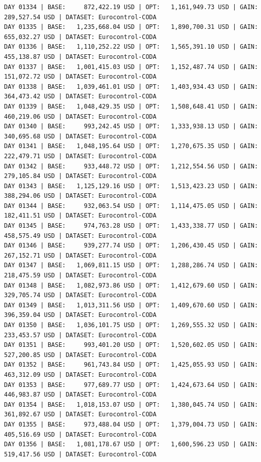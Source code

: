 \documentclass[11pt,a4paper]{article}
\begin{document}
\begin{verbatim}
DAY 01334 | BASE:     872,422.19 USD | OPT:   1,161,949.73 USD | GAIN: 289,527.54 USD | DATASET: Eurocontrol-CODA
DAY 01335 | BASE:   1,235,668.04 USD | OPT:   1,890,700.31 USD | GAIN: 655,032.27 USD | DATASET: Eurocontrol-CODA
DAY 01336 | BASE:   1,110,252.22 USD | OPT:   1,565,391.10 USD | GAIN: 455,138.87 USD | DATASET: Eurocontrol-CODA
DAY 01337 | BASE:   1,001,415.03 USD | OPT:   1,152,487.74 USD | GAIN: 151,072.72 USD | DATASET: Eurocontrol-CODA
DAY 01338 | BASE:   1,039,461.01 USD | OPT:   1,403,934.43 USD | GAIN: 364,473.42 USD | DATASET: Eurocontrol-CODA
DAY 01339 | BASE:   1,048,429.35 USD | OPT:   1,508,648.41 USD | GAIN: 460,219.06 USD | DATASET: Eurocontrol-CODA
DAY 01340 | BASE:     993,242.45 USD | OPT:   1,333,938.13 USD | GAIN: 340,695.68 USD | DATASET: Eurocontrol-CODA
DAY 01341 | BASE:   1,048,195.64 USD | OPT:   1,270,675.35 USD | GAIN: 222,479.71 USD | DATASET: Eurocontrol-CODA
DAY 01342 | BASE:     933,448.72 USD | OPT:   1,212,554.56 USD | GAIN: 279,105.84 USD | DATASET: Eurocontrol-CODA
DAY 01343 | BASE:   1,125,129.16 USD | OPT:   1,513,423.23 USD | GAIN: 388,294.06 USD | DATASET: Eurocontrol-CODA
DAY 01344 | BASE:     932,063.54 USD | OPT:   1,114,475.05 USD | GAIN: 182,411.51 USD | DATASET: Eurocontrol-CODA
DAY 01345 | BASE:     974,763.28 USD | OPT:   1,433,338.77 USD | GAIN: 458,575.49 USD | DATASET: Eurocontrol-CODA
DAY 01346 | BASE:     939,277.74 USD | OPT:   1,206,430.45 USD | GAIN: 267,152.71 USD | DATASET: Eurocontrol-CODA
DAY 01347 | BASE:   1,069,811.15 USD | OPT:   1,288,286.74 USD | GAIN: 218,475.59 USD | DATASET: Eurocontrol-CODA
DAY 01348 | BASE:   1,082,973.86 USD | OPT:   1,412,679.60 USD | GAIN: 329,705.74 USD | DATASET: Eurocontrol-CODA
DAY 01349 | BASE:   1,013,311.56 USD | OPT:   1,409,670.60 USD | GAIN: 396,359.04 USD | DATASET: Eurocontrol-CODA
DAY 01350 | BASE:   1,036,101.75 USD | OPT:   1,269,555.32 USD | GAIN: 233,453.57 USD | DATASET: Eurocontrol-CODA
DAY 01351 | BASE:     993,401.20 USD | OPT:   1,520,602.05 USD | GAIN: 527,200.85 USD | DATASET: Eurocontrol-CODA
DAY 01352 | BASE:     961,743.84 USD | OPT:   1,425,055.93 USD | GAIN: 463,312.09 USD | DATASET: Eurocontrol-CODA
DAY 01353 | BASE:     977,689.77 USD | OPT:   1,424,673.64 USD | GAIN: 446,983.87 USD | DATASET: Eurocontrol-CODA
DAY 01354 | BASE:   1,018,153.07 USD | OPT:   1,380,045.74 USD | GAIN: 361,892.67 USD | DATASET: Eurocontrol-CODA
DAY 01355 | BASE:     973,488.04 USD | OPT:   1,379,004.73 USD | GAIN: 405,516.69 USD | DATASET: Eurocontrol-CODA
DAY 01356 | BASE:   1,081,178.67 USD | OPT:   1,600,596.23 USD | GAIN: 519,417.56 USD | DATASET: Eurocontrol-CODA

\end{verbatim}
\end{document}
